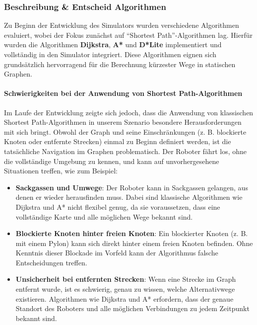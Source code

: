 \documentclass[main.tex]{subfiles} %
\begin{document}
\subsubsection{Beschreibung \& Entscheid Algorithmen}

Zu Beginn der Entwicklung des Simulators wurden verschiedene Algorithmen evaluiert, wobei der Fokus zunächst auf \enquote{Shortest Path}-Algorithmen lag. Hierfür wurden die Algorithmen \textbf{Dijkstra}, \textbf{A*} und \textbf{D*Lite} implementiert und vollständig in den Simulator integriert. Diese Algorithmen eignen sich grundsätzlich hervorragend für die Berechnung kürzester Wege in statischen Graphen.

\paragraph{Schwierigkeiten bei der Anwendung von Shortest Path-Algorithmen}

Im Laufe der Entwicklung zeigte sich jedoch, dass die Anwendung von klassischen Shortest Path-Algorithmen in unserem Szenario besondere Herausforderungen mit sich bringt. Obwohl der Graph und seine Einschränkungen (z. B. blockierte Knoten oder entfernte Strecken) einmal zu Beginn definiert werden, ist die tatsächliche Navigation im Graphen problematisch. Der Roboter fährt los, ohne die vollständige Umgebung zu kennen, und kann auf unvorhergesehene Situationen treffen, wie zum Beispiel:

\begin{itemize}
    \item \textbf{Sackgassen und Umwege}:  
    Der Roboter kann in Sackgassen gelangen, aus denen er wieder herausfinden muss. Dabei sind klassische Algorithmen wie Dijkstra und A* nicht flexibel genug, da sie voraussetzen, dass eine vollständige Karte und alle möglichen Wege bekannt sind.

    \item \textbf{Blockierte Knoten hinter freien Knoten}:  
    Ein blockierter Knoten (z. B. mit einem Pylon) kann sich direkt hinter einem freien Knoten befinden. Ohne Kenntnis dieser Blockade im Vorfeld kann der Algorithmus falsche Entscheidungen treffen.

    \item \textbf{Unsicherheit bei entfernten Strecken}:  
    Wenn eine Strecke im Graph entfernt wurde, ist es schwierig, genau zu wissen, welche Alternativwege existieren. Algorithmen wie Dijkstra und A* erfordern, dass der genaue Standort des Roboters und alle möglichen Verbindungen zu jedem Zeitpunkt bekannt sind.
\end{itemize}
\end{document}
